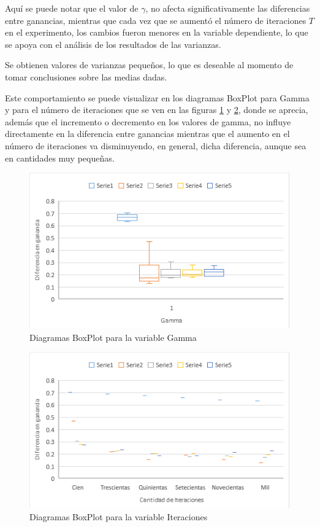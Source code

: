 Aquí se puede notar que el valor de $\gamma$, no afecta significativamente las diferencias entre ganancias, mientras que cada vez que se aumentó el número de iteraciones $T$ en el experimento, los cambios fueron menores en la variable dependiente, lo que se apoya con el análisis de los resultados de las varianzas.

Se obtienen valores de varianzas pequeños, lo que es deseable al momento de tomar conclusiones sobre las medias dadas.

Este comportamiento se puede visualizar en los diagramas BoxPlot para Gamma y para el número de iteraciones que se ven en las figuras \ref{Cajas1} y \ref{Cajas1_1}, donde se aprecia, además que el incremento o decremento en los valores de gamma, no influye directamente en la diferencia entre ganancias mientras que el aumento en el número de iteraciones va disminuyendo, en general, dicha diferencia, aunque sea en cantidades muy pequeñas.


\begin{figure} [h]
	\centering
	\includegraphics[scale=1]{Cajas1.png}
	\caption{Diagramas BoxPlot para la variable Gamma}
	\label{Cajas1}
\end{figure}

\begin{figure} 
	\centering
	\includegraphics[scale=1]{Cajas1_1.png}
	\caption{Diagramas BoxPlot para la variable Iteraciones}
	\label{Cajas1_1}
\end{figure}


